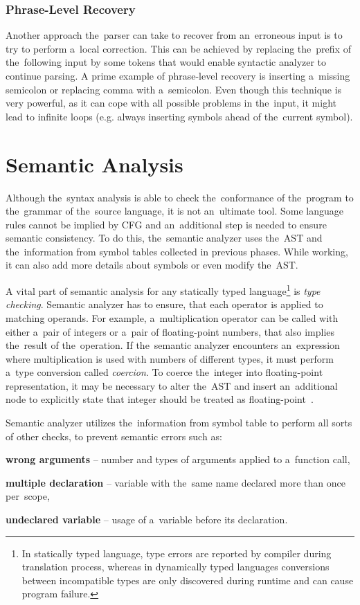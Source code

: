 \documentclass[
  digital, %
  table,   %
  lof,     %
  lot,     %
  oneside,
]{fithesis3}
\begin{document}
\subsubsection{\textbf{Phrase-Level Recovery}}
Another approach the~parser can take to recover from an~erroneous input is to try to perform a~local correction. This can be achieved by replacing the~prefix of the~following input by some tokens that would enable syntactic analyzer to continue parsing. A prime example of phrase-level recovery is inserting a~missing semicolon or replacing comma with a~semicolon. Even though this technique is very powerful, as it can cope with all possible problems in the~input, it might lead to infinite loops (e.g. always inserting symbols ahead of the~current symbol).

\section{Semantic Analysis}
Although the~syntax analysis is able to check the~conformance of the~program to the~grammar of the~source language, it is not an~ultimate tool. Some language rules cannot be implied by CFG and an~additional step is needed to ensure semantic consistency. To do this, the~semantic analyzer uses the~AST and the~information from symbol tables collected in previous phases. While working, it can also add more details about symbols or even modify the~AST. 

A vital part of semantic analysis for any statically typed language\footnote{In statically typed language, type errors are reported by compiler during translation process, whereas in dynamically typed languages conversions between incompatible types are only discovered during runtime and can cause program failure.} is \textit{type checking}. Semantic analyzer has to ensure, that each operator is applied to matching operands. For example, a~multiplication operator can be called with either a~pair of integers or a~pair of floating-point numbers, that also implies the~result of the~operation. If the~semantic analyzer encounters an~expression where multiplication is used with numbers of different types, it must perform a~type conversion called \textit{coercion}. To coerce the~integer into floating-point representation, it may be necessary to alter the~AST and insert an~additional node to explicitly state that integer should be treated as floating-point~\cite{dragon-book}. 

Semantic analyzer utilizes the~information from symbol table to perform all sorts of other checks, to prevent semantic errors such as:
\begin{compactitem}
  \item \textbf{wrong arguments} -- number and types of arguments applied to a~function call,
  \item \textbf{multiple declaration} -- variable with the~same name declared more than once per~scope,
  \item \textbf{undeclared variable} -- usage of a~variable before its declaration.
\end{compactitem}
    
\end{document}

